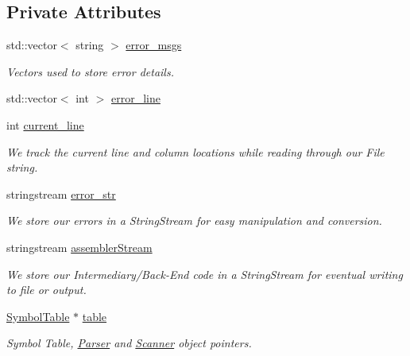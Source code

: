 \subsection*{Private Attributes}
\begin{DoxyCompactItemize}
\item 
std::vector$<$ string $>$ \hyperlink{classAdmin_ad8c946fbb7ed32ad1f73a24eaf422c53}{error\_\-msgs}
\begin{DoxyCompactList}\small\item\em Vectors used to store error details. \item\end{DoxyCompactList}\item 
std::vector$<$ int $>$ \hyperlink{classAdmin_a2070f3b7ce2f309da1b080c3d3f07ecf}{error\_\-line}
\item 
int \hyperlink{classAdmin_a77039c04350669e25d604593a77bea36}{current\_\-line}
\begin{DoxyCompactList}\small\item\em We track the current line and column locations while reading through our File string. \item\end{DoxyCompactList}\item 
stringstream \hyperlink{classAdmin_ad5610f86befa3a43987ce15cfc389d28}{error\_\-str}
\begin{DoxyCompactList}\small\item\em We store our errors in a StringStream for easy manipulation and conversion. \item\end{DoxyCompactList}\item 
stringstream \hyperlink{classAdmin_a008c56533042666979d7c685dc5d01a8}{assemblerStream}
\begin{DoxyCompactList}\small\item\em We store our Intermediary/Back-\/End code in a StringStream for eventual writing to file or output. \item\end{DoxyCompactList}\item 
\hyperlink{classSymbolTable}{SymbolTable} $\ast$ \hyperlink{classAdmin_afb5161f047f166b985257447b9c47f22}{table}
\begin{DoxyCompactList}\small\item\em Symbol Table, \hyperlink{classParser}{Parser} and \hyperlink{classScanner}{Scanner} object pointers. \item\end{DoxyCompactList}\item 

\end{DoxyCompactItemize}
